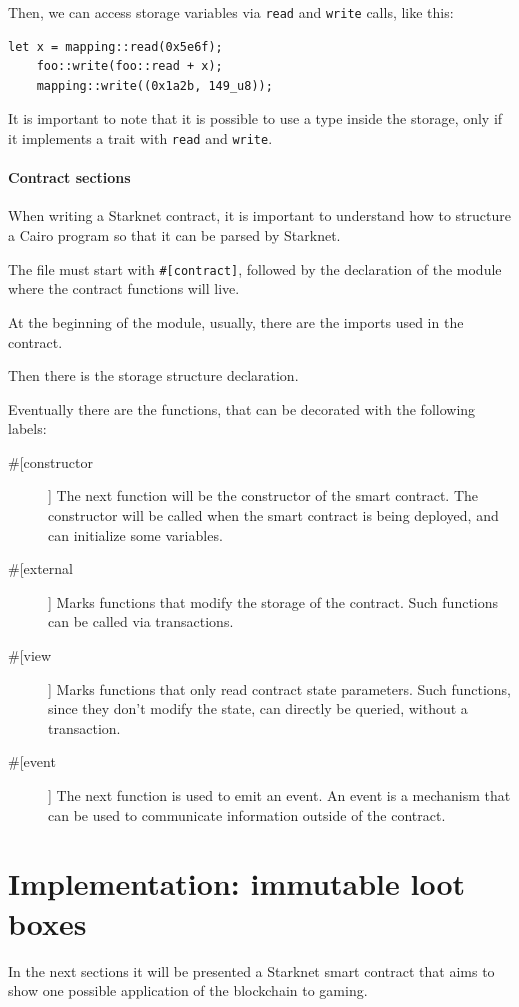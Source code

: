 \documentclass[12pt]{article}
\begin{document}
Then, we can access storage variables via \verb|read| and \verb|write| calls, like this:
\begin{lstlisting}[language=cairo]
    let x = mapping::read(0x5e6f);
    foo::write(foo::read + x);
    mapping::write((0x1a2b, 149_u8));
\end{lstlisting}

It is important to note that it is possible to use a type inside the storage, only if it implements a trait with \verb|read| and \verb|write|.

\subsection{Contract sections} \label{subsection:contract_labels}
When writing a Starknet contract, it is important to understand how to structure a Cairo program so that it can be parsed by Starknet.

The file must start with \verb|#[contract]|, followed by the declaration of the module where the contract functions will live.

At the beginning of the module, usually, there are the imports used in the contract.

Then there is the storage structure declaration.

Eventually there are the functions, that can be decorated with the following labels:
\begin{description}
    \item[\#[constructor]] The next function will be the constructor of the smart contract. The constructor will be called when the smart contract is being deployed, and can initialize some variables.
    \item[\#[external]] Marks functions that modify the storage of the contract. Such functions can be called via transactions.
    \item[\#[view]] Marks functions that only read contract state parameters. Such functions, since they don't modify the state, can directly be queried, without a transaction.
    \item[\#[event]] The next function is used to emit an event. An event is a mechanism that can be used to communicate information outside of the contract.
\end{description}

\newpage
\part{Implementation: immutable loot boxes} \label{part:iilb}
In the next sections it will be presented a Starknet smart contract that aims to show one possible application of the blockchain to gaming.
\end{document}
